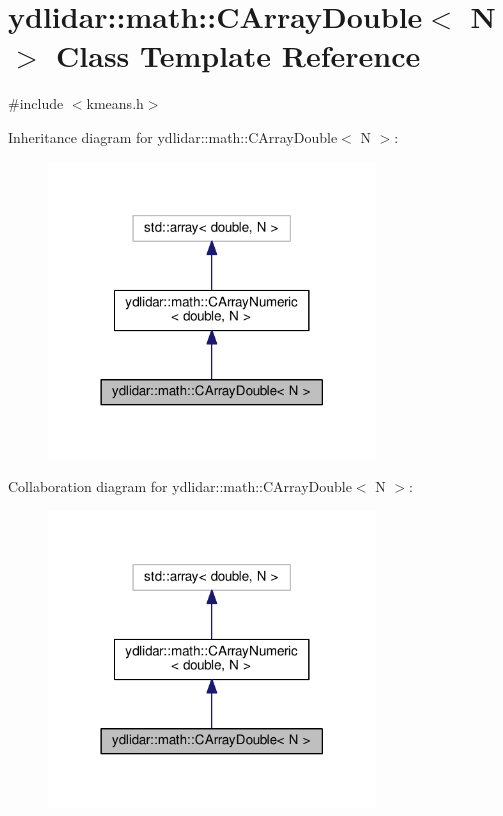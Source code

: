 \hypertarget{classydlidar_1_1math_1_1_c_array_double}{}\section{ydlidar\+:\+:math\+:\+:C\+Array\+Double$<$ N $>$ Class Template Reference}
\label{classydlidar_1_1math_1_1_c_array_double}


{\ttfamily \#include $<$kmeans.\+h$>$}



Inheritance diagram for ydlidar\+:\+:math\+:\+:C\+Array\+Double$<$ N $>$\+:
\nopagebreak
\begin{figure}[H]
\begin{center}
\leavevmode
\includegraphics[width=246pt]{classydlidar_1_1math_1_1_c_array_double__inherit__graph}
\end{center}
\end{figure}


Collaboration diagram for ydlidar\+:\+:math\+:\+:C\+Array\+Double$<$ N $>$\+:
\nopagebreak
\begin{figure}[H]
\begin{center}
\leavevmode
\includegraphics[width=246pt]{classydlidar_1_1math_1_1_c_array_double__coll__graph}
\end{center}
\end{figure}
